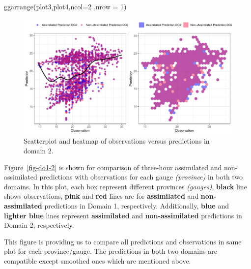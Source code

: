 \documentclass[
  letterpaper,
  DIV=11,
  numbers=noendperiod,
  abstract]{scrartcl}
\newenvironment{Shaded}{\begin{snugshade}}{\end{snugshade}}
\newcommand{\AttributeTok}[1]{\textcolor[rgb]{0.40,0.45,0.13}{#1}}
\newcommand{\DecValTok}[1]{\textcolor[rgb]{0.68,0.00,0.00}{#1}}
\newcommand{\FunctionTok}[1]{\textcolor[rgb]{0.28,0.35,0.67}{#1}}
\newcommand{\NormalTok}[1]{\textcolor[rgb]{0.00,0.23,0.31}{#1}}
\begin{document}
\begin{Shaded}
\begin{Highlighting}[]
\FunctionTok{ggarrange}\NormalTok{(plot3,plot4,}\AttributeTok{ncol=}\DecValTok{2}\NormalTok{ ,}\AttributeTok{nrow =} \DecValTok{1}\NormalTok{)}
\end{Highlighting}
\end{Shaded}

\begin{figure}[H]

{\centering \includegraphics{WRF_pdf_files/figure-pdf/fig-sc2-1.pdf}

}

\caption{\label{fig-sc2}Scatterplot and heatmap of observations versus
predictions in domain 2.}

\end{figure}

Figure~\ref{fig-do1-2} is shown for comparison of three-hour assimilated
and non-assimilated predictions with observations for each gauge
\emph{(province)} in both two domains. In this plot, each box represent
different provinces \emph{(gauges)}, \textbf{black} line shows
observations, \textbf{pink} and \textbf{red} lines are for
\textbf{assimilated} and \textbf{non-assimilated} predictions in Domain
1, respectively. Additionally, \textbf{blue} and \textbf{lighter blue}
lines represent \textbf{assimilated} and \textbf{non-assimilated}
predictions in Domain 2, respectively.

This figure is providing us to compare all predictions and observations
in same plot for each province/gauge. The predictions in both two
domains are compatible except smoothed ones which are mentioned above.
\end{document}
